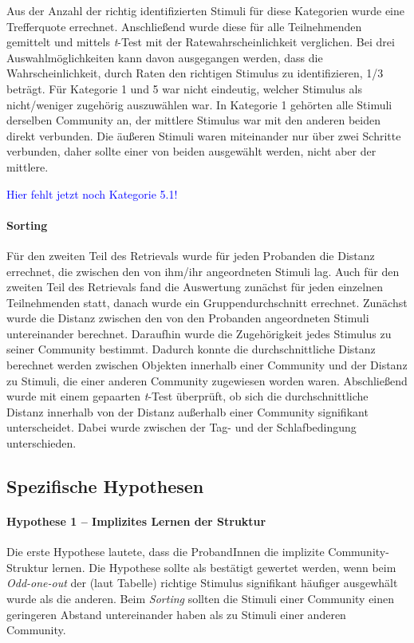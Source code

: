 \documentclass[preprint,12pt]{elsarticle}
\begin{document}
Aus der Anzahl der richtig identifizierten Stimuli für diese Kategorien wurde eine Trefferquote errechnet. Anschließend wurde diese für alle Teilnehmenden gemittelt und mittels \textit{t}-Test mit der Ratewahrscheinlichkeit verglichen. Bei drei Auswahlmöglichkeiten kann davon ausgegangen werden, dass die Wahrscheinlichkeit, durch Raten den richtigen Stimulus zu identifizieren, 1/3 beträgt.
Für Kategorie 1 und 5 war nicht eindeutig, welcher Stimulus als nicht/weniger zugehörig auszuwählen war. In Kategorie 1 gehörten alle Stimuli derselben Community an, der mittlere Stimulus war mit den anderen beiden direkt verbunden. Die äußeren Stimuli waren miteinander nur über zwei Schritte verbunden, daher sollte einer von beiden ausgewählt werden, nicht aber der mittlere.

\textcolor{blue}{Hier fehlt jetzt noch Kategorie 5.1!}

\paragraph{Sorting}
Für den zweiten Teil des Retrievals wurde für jeden Probanden die Distanz errechnet, die zwischen den von ihm/ihr angeordneten Stimuli lag.
Auch für den zweiten Teil des Retrievals fand die Auswertung zunächst für jeden einzelnen Teilnehmenden statt, danach wurde ein Gruppendurchschnitt errechnet. Zunächst wurde die Distanz zwischen den von den Probanden angeordneten Stimuli untereinander berechnet. Daraufhin wurde die Zugehörigkeit jedes Stimulus zu seiner Community bestimmt. Dadurch konnte die durchschnittliche Distanz berechnet werden zwischen Objekten innerhalb einer Community und der Distanz zu Stimuli, die einer anderen Community zugewiesen worden waren. Abschließend wurde mit einem gepaarten \textit{t}-Test überprüft, ob sich die durchschnittliche Distanz innerhalb von der Distanz außerhalb einer Community signifikant unterscheidet. Dabei wurde zwischen der Tag- und der Schlafbedingung unterschieden.

\subsection{Spezifische Hypothesen}

\paragraph{Hypothese 1 – Implizites Lernen der Struktur}
Die erste Hypothese lautete, dass die ProbandInnen die implizite Community-Struktur lernen.
Die Hypothese sollte als bestätigt gewertet werden, wenn beim \textit{Odd-one-out} der (laut Tabelle) richtige Stimulus signifikant häufiger ausgewhält wurde als die anderen. Beim \textit{Sorting} sollten die Stimuli einer Community einen geringeren Abstand untereinander haben als zu Stimuli einer anderen Community.
\end{document}
